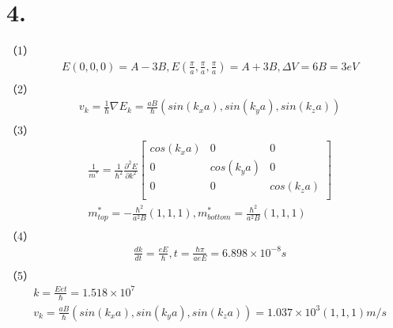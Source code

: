\documentclass[UTF8]{ctexart}
\begin{document}
\section*{4.}
（1）
\begin{equation*}
    \begin{aligned}
        & E(0,0,0)=A-3B, E(\frac{\pi}{a},\frac{\pi}{a},\frac{\pi}{a})=A+3B, \Delta V = 6B=3eV\\
    \end{aligned}
\end{equation*}
（2）
\begin{equation*}
    \begin{aligned}
        &v_k=\frac{1}{\hbar}\nabla E_k=\frac{aB}{\hbar}(sin(k_xa),sin(k_ya),sin(k_za))\\
    \end{aligned}
\end{equation*}
（3）
\begin{equation*}
    \begin{aligned}
        &\frac{1}{m^*}=\frac{1}{\hbar^2}\frac{\partial^2E}{\partial k^2}
        \begin{bmatrix}
            cos(k_xa)&0&0\\
            0&cos(k_ya)&0\\
            0&0&cos(k_za)\\
        \end{bmatrix}\\
        &m^*_{top} = -\frac{\hbar^2}{a^2B}(1,1,1), m^*_{bottom} = \frac{\hbar^2}{a^2B}(1,1,1)\\
    \end{aligned}
\end{equation*}
（4）
\begin{equation*}
    \begin{aligned}
        & \frac{dk}{dt}=\frac{eE}{\hbar}, t=\frac{\hbar\pi}{aeE}=6.898\times10^{-8}s\\
    \end{aligned}
\end{equation*}
（5）
\begin{equation*}
    \begin{aligned}
        &k=\frac{Eet}{\hbar}=1.518\times10^7\\
        &v_k=\frac{aB}{\hbar}(sin(k_xa),sin(k_ya),sin(k_za))=1.037\times10^3(1,1,1)m/s\\
    \end{aligned}
\end{equation*}
\end{document}
